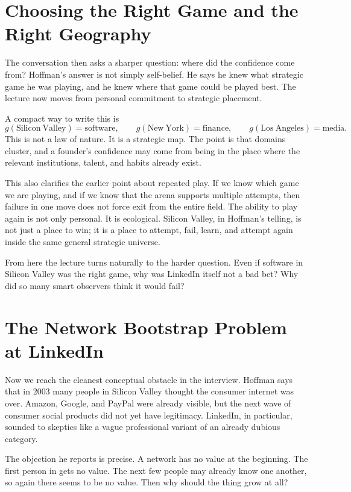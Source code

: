 \section{Choosing the Right Game and the Right Geography}

The conversation then asks a sharper question: where did the confidence come from? Hoffman's answer is not simply self-belief. He says he knew what strategic game he was playing, and he knew where that game could be played best. The lecture now moves from personal commitment to strategic placement.

A compact way to write this is
\begin{equation}
g(\mathrm{Silicon\ Valley})=\mathrm{software}, \qquad
g(\mathrm{New\ York})=\mathrm{finance}, \qquad
g(\mathrm{Los\ Angeles})=\mathrm{media}.
\end{equation}
This is not a law of nature. It is a strategic map. The point is that domains cluster, and a founder's confidence may come from being in the place where the relevant institutions, talent, and habits already exist.

This also clarifies the earlier point about repeated play. If we know which game we are playing, and if we know that the arena supports multiple attempts, then failure in one move does not force exit from the entire field. The ability to play again is not only personal. It is ecological. Silicon Valley, in Hoffman's telling, is not just a place to win; it is a place to attempt, fail, learn, and attempt again inside the same general strategic universe.

From here the lecture turns naturally to the harder question. Even if software in Silicon Valley was the right game, why was LinkedIn itself not a bad bet? Why did so many smart observers think it would fail?

\section{The Network Bootstrap Problem at LinkedIn}

Now we reach the cleanest conceptual obstacle in the interview. Hoffman says that in 2003 many people in Silicon Valley thought the consumer internet was over. Amazon, Google, and PayPal were already visible, but the next wave of consumer social products did not yet have legitimacy. LinkedIn, in particular, sounded to skeptics like a vague professional variant of an already dubious category.

The objection he reports is precise. A network has no value at the beginning. The first person in gets no value. The next few people may already know one another, so again there seems to be no value. Then why should the thing grow at all?


